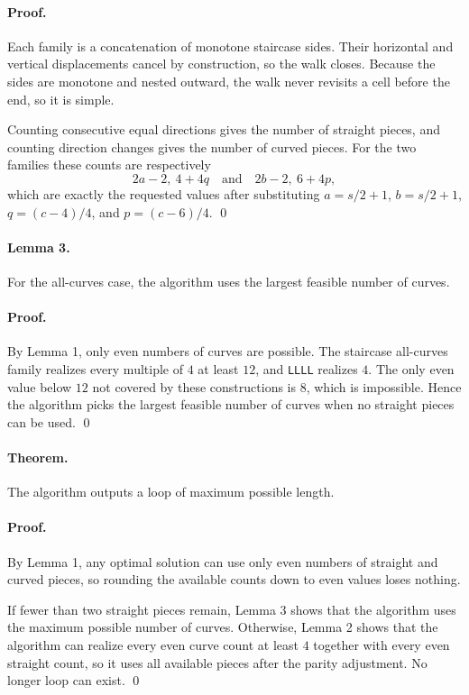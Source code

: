 \documentclass[11pt]{article}
\begin{document}
\paragraph{Proof.}
Each family is a concatenation of monotone staircase sides. Their horizontal and vertical displacements
cancel by construction, so the walk closes. Because the sides are monotone and nested outward, the walk
never revisits a cell before the end, so it is simple.

Counting consecutive equal directions gives the number of straight pieces, and counting direction changes
gives the number of curved pieces. For the two families these counts are respectively
\[
2a-2,\ 4+4q
\quad\text{and}\quad
2b-2,\ 6+4p,
\]
which are exactly the requested values after substituting $a=s/2+1$, $b=s/2+1$, $q=(c-4)/4$, and
$p=(c-6)/4$. \qed

\paragraph{Lemma 3.}
For the all-curves case, the algorithm uses the largest feasible number of curves.

\paragraph{Proof.}
By Lemma 1, only even numbers of curves are possible. The staircase all-curves family realizes every
multiple of $4$ at least $12$, and \texttt{LLLL} realizes $4$. The only even value below $12$ not covered
by these constructions is $8$, which is impossible. Hence the algorithm picks the largest feasible number
of curves when no straight pieces can be used. \qed

\paragraph{Theorem.}
The algorithm outputs a loop of maximum possible length.

\paragraph{Proof.}
By Lemma 1, any optimal solution can use only even numbers of straight and curved pieces, so rounding
the available counts down to even values loses nothing.

If fewer than two straight pieces remain, Lemma 3 shows that the algorithm uses the maximum possible
number of curves. Otherwise, Lemma 2 shows that the algorithm can realize every even curve count at
least $4$ together with every even straight count, so it uses all available pieces after the parity adjustment.
No longer loop can exist. \qed
\end{document}
